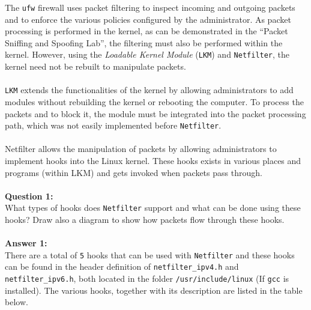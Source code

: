 \documentclass[a4paper,12pt]{article}
\begin{document}
\noindent The \texttt{ufw} firewall uses packet filtering to inspect incoming and outgoing packets and to enforce the various policies configured by the administrator. As packet processing is performed in the kernel, as can be demonstrated in the ``Packet Sniffing and Spoofing Lab'', the filtering must also be performed within the kernel. However, using the \textit{Loadable Kernel Module} (\texttt{LKM}) and \texttt{Netfilter}, the kernel need not be rebuilt to manipulate packets. 
\\\\\noindent
\texttt{LKM} extends the functionalities of the kernel by allowing administrators to add modules without rebuilding the kernel or rebooting the computer. To process the packets and to block it, the module must be integrated into the packet processing path, which was not easily implemented before \texttt{Netfilter}.\\\\
Netfilter allows the manipulation of packets by allowing administrators to implement hooks into the Linux kernel. These hooks exists in various places and programs (within LKM) and gets invoked when packets pass through.
\\\\\textbf{Question 1:}\\
What types of hooks does \texttt{Netfilter} support and what can be done using these hooks? Draw also a diagram to show how packets flow through these hooks.\\\\
\textbf{Answer 1:}\\
There are a total of \texttt{5} hooks that can be used with \texttt{Netfilter} and these hooks can be found in the header definition of \texttt{netfilter\_ipv4.h} and \texttt{netfilter\_ipv6.h}, both located in the folder \texttt{/usr/include/linux} (If \texttt{gcc} is installed). The various hooks, together with its description are listed in the table below.
\end{document}
